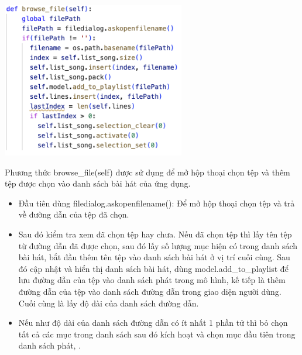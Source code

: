\documentclass[a4paper]{article}
\begin{document}
\begin{center}
\includegraphics[width=80mm]{template_SGU 2/view_browse.png}
\end{center}
\hspace*{0.5} Phương thức browse\_file(self) được sử dụng để mở hộp thoại chọn tệp và thêm tệp được chọn vào danh sách bài hát của ứng dụng.
\begin{itemize}
    \item Đầu tiên dùng filedialog.askopenfilename(): Để mở hộp thoại chọn tệp và trả về đường dẫn của tệp đã chọn.
    \item Sau đó kiểm tra xem đã chọn tệp hay chưa. Nếu đã chọn tệp thì lấy tên tệp từ đường dẫn đã được chọn, sau đó lấy số lượng mục hiện có trong danh sách bài hát, bắt đầu thêm tên tệp vào danh sách bài hát ở vị trí cuối cùng. Sau đó cập nhật và hiển thị danh sách bài hát, dùng model.add\_to\_playlist để lưu đường dẫn của tệp vào danh sách phát trong mô hình, kế tiếp là thêm đường dẫn của tệp vào danh sách đường dẫn trong giao diện người dùng. Cuối cùng là lấy độ dài của danh sách đường dẫn.
    \item Nếu như độ dài của danh sách đường dẫn có ít nhất 1 phần tử thì bỏ chọn tất cả các mục trong danh sách sau đó kích hoạt và chọn mục đầu tiên trong danh sách phát, .
\end{itemize}
\end{document}
